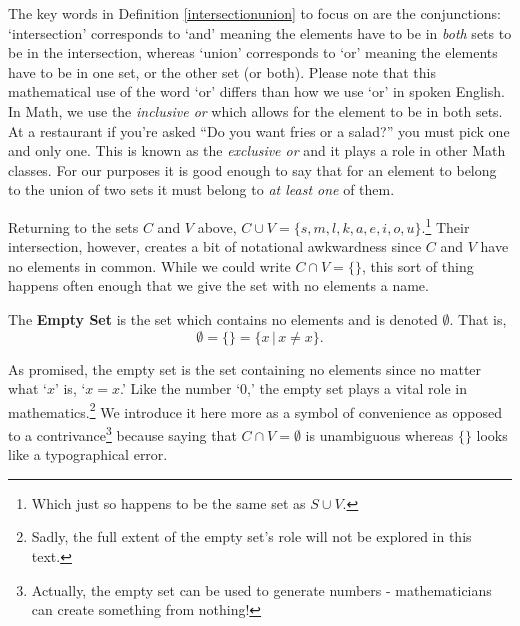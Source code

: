 \medskip

The key words in Definition \ref{intersectionunion} to focus on are the conjunctions:  `intersection' corresponds to `and' meaning the elements have to be in \textit{both} sets to be in the intersection, whereas `union' corresponds to `or' meaning the elements have to be in one set, or the other set (or both).  Please note that this mathematical use of the word `or' differs than how we use `or' in spoken English.  In Math, we use the \emph{inclusive or} which allows for the element to be in both sets.  At a restaurant if you're asked ``Do you want fries or a salad?'' you must pick one and only one.  This is known as the \emph{exclusive or} and it plays a role in other Math classes.  For our purposes it is good enough to say that for an element to belong to the union of two sets it must belong to \textit{at least one} of them.

\smallskip

Returning to the sets $C$ and $V$  above, $C \cup V = \{ s, m, l, k, a, e, i, o, u\}$.\footnote{Which just so happens to be the same set as $S \cup V$.}  Their intersection, however, creates a bit of notational awkwardness since $C$ and $V$ have no elements in common.  While we could write $C \cap V = \{ \}$, this sort of thing happens often enough that we give the set with no elements a name. 

\medskip

\colorbox{ResultColor}{\bbm

\begin{defn} \label{emptysetdefn}

The \textbf{Empty Set} is the set which contains no elements and is denoted $\emptyset$.  That is, \[\emptyset=\{ \}=\{x\,|\,\mbox{$x \neq x$}\}.\]  

\end{defn}

\ebm}

\medskip

As promised, the empty set is the set containing no elements since no matter what `$x$' is, `$x = x$.'  Like the number `$0$,'  the empty set plays a vital role in mathematics.\footnote{Sadly, the full extent of the empty set's role will not be explored in this text.} We introduce it here more as a symbol of convenience as opposed to a contrivance\footnote{Actually, the empty set can be used to generate numbers -  mathematicians can create something from nothing!} because saying that $C \cap V = \emptyset$ is unambiguous whereas $\{ \}$ looks like a typographical error.    

